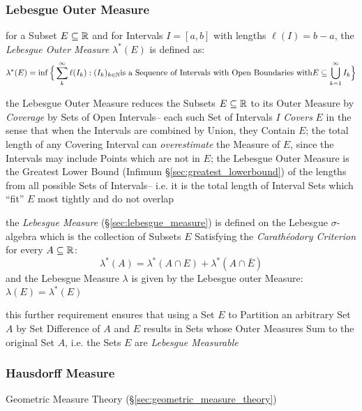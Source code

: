 \subsubsection{Lebesgue Outer Measure}\label{sec:lebesgue_outer_measure}

for a Subset $E \subseteq \mathbb{R}$ and for Intervals $I = [a,b]$ with lengths
$\ell(I) = b-a$, the \emph{Lebesgue Outer Measure} $\lambda^*(E)$ is defined as:
\[
  \lambda^*(E) = \inf \Big\{ \sum_k^\infty \ell(I_k) : (I_k)_{k \in \mathbb{N}}
    \text{is a Sequence of Intervals with Open Boundaries with}
    E \subseteq \bigcup_{k=1}^\infty I_k \Big\}
\]

the Lebesgue Outer Measure reduces the Subsets $E \subseteq \mathbb{R}$ to its Outer
Measure by \emph{Coverage} by Sets of Open Intervals-- each such Set of
Intervals $I$ \emph{Covers} $E$ in the sense that when the Intervals are
combined by Union, they Contain $E$; the total length of any Covering Interval
can \emph{overestimate} the Measure of $E$, since the Intervals may include
Points which are not in $E$; the Lebesgue Outer Measure is the Greatest Lower
Bound (Infimum \S\ref{sec:greatest_lowerbound}) of the lengths from all possible
Sets of Intervals-- i.e. it is the total length of Interval Sets which ``fit''
$E$ most tightly and do not overlap

the \emph{Lebesgue Measure} (\S\ref{sec:lebesgue_measure}) is defined on the
Lebesgue $\sigma$-algebra which is the collection of Subsets $E$ Satisfying the
\emph{Carath\'eodory Criterion} for every $A \subseteq \mathbb{R}$:
\[
  \lambda^*(A) = \lambda^*(A \cap E) + \lambda^*(A \cap \bar{E})
\]
and the Lebesgue Measure $\lambda$ is given by the Lebesgue outer Measure:
$\lambda(E) = \lambda^*(E)$

this further requirement ensures that using a Set $E$ to Partition an arbitrary
Set $A$ by Set Difference of $A$ and $E$ results in Sets whose Outer Measures
Sum to the original Set $A$, i.e. the Sets $E$ are \emph{Lebesgue Measurable}



\subsubsection{Hausdorff Measure}\label{sec:hausdorff_measure}

\fist Geometric Measure Theory (\S\ref{sec:geometric_measure_theory})




